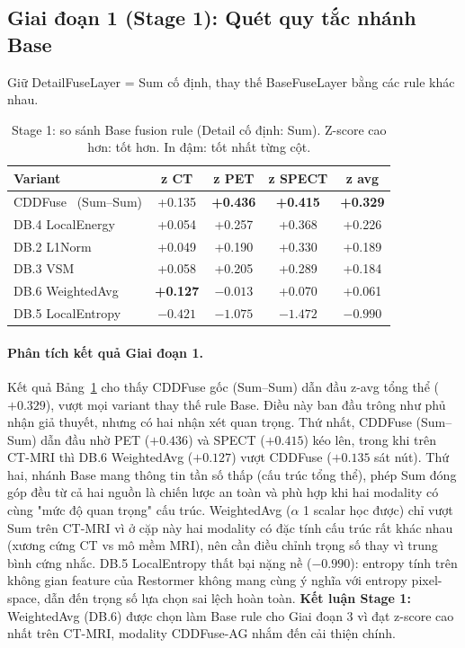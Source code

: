 \subsection{Giai đoạn 1 (Stage 1): Quét quy tắc nhánh Base}
\label{ssec:ablation-stage1}

Giữ DetailFuseLayer = Sum cố định, thay thế BaseFuseLayer bằng các rule khác nhau.

\begin{table}[H]
\centering
\small
\caption[Ablation Stage 1: so sánh quy tắc nhánh Base]{Stage 1: so sánh Base fusion rule (Detail cố định: Sum). Z-score cao hơn: tốt hơn. In đậm: tốt nhất từng cột.}
\label{tab:moduleD-stage1}
\begin{tabular}{lcccc}
\toprule
\textbf{Variant} & \textbf{z CT} & \textbf{z PET} & \textbf{z SPECT} & \textbf{z avg} \\
\midrule
CDDFuse~\cite{zhao2023cddfuse} (Sum--Sum) & +0.135 & \textbf{+0.436} & \textbf{+0.415} & \textbf{+0.329} \\
DB.4 LocalEnergy~\cite{burt1983laplacian}  & +0.054 & +0.257 & +0.368 & +0.226 \\
DB.2 L1Norm~\cite{li2018densefuse}         & +0.049 & +0.190 & +0.330 & +0.189 \\
DB.3 VSM~\cite{wang2008vsm}                & +0.058 & +0.205 & +0.289 & +0.184 \\
DB.6 WeightedAvg~\cite{li2018densefuse}    & \textbf{+0.127} & $-0.013$ & +0.070 & +0.061 \\
DB.5 LocalEntropy~\cite{liu2018survey}     & $-0.421$ & $-1.075$ & $-1.472$ & $-0.990$ \\
\bottomrule
\end{tabular}
\end{table}

\paragraph{Phân tích kết quả Giai đoạn 1.}
Kết quả Bảng~\ref{tab:moduleD-stage1} cho thấy CDDFuse gốc (Sum--Sum) dẫn đầu z-avg tổng thể ($+0.329$), vượt mọi variant thay thế rule Base. Điều này ban đầu trông như phủ nhận giả thuyết, nhưng có hai nhận xét quan trọng. Thứ nhất, CDDFuse (Sum--Sum) dẫn đầu nhờ PET ($+0.436$) và SPECT ($+0.415$) kéo lên, trong khi trên CT-MRI thì DB.6 WeightedAvg ($+0.127$) vượt CDDFuse ($+0.135$ sát nút). Thứ hai, nhánh Base mang thông tin tần số thấp (cấu trúc tổng thể), phép Sum đóng góp đều từ cả hai nguồn là chiến lược an toàn và phù hợp khi hai modality có cùng "mức độ quan trọng" cấu trúc. WeightedAvg ($\alpha$ 1 scalar học được) chỉ vượt Sum trên CT-MRI vì ở cặp này hai modality có đặc tính cấu trúc rất khác nhau (xương cứng CT vs mô mềm MRI), nên cần điều chỉnh trọng số thay vì trung bình cứng nhắc. DB.5 LocalEntropy thất bại nặng nề ($-0.990$): entropy tính trên không gian feature của Restormer không mang cùng ý nghĩa với entropy pixel-space, dẫn đến trọng số lựa chọn sai lệch hoàn toàn. \textbf{Kết luận Stage 1:} WeightedAvg (DB.6) được chọn làm Base rule cho Giai đoạn 3 vì đạt z-score cao nhất trên CT-MRI, modality CDDFuse-AG nhắm đến cải thiện chính.


